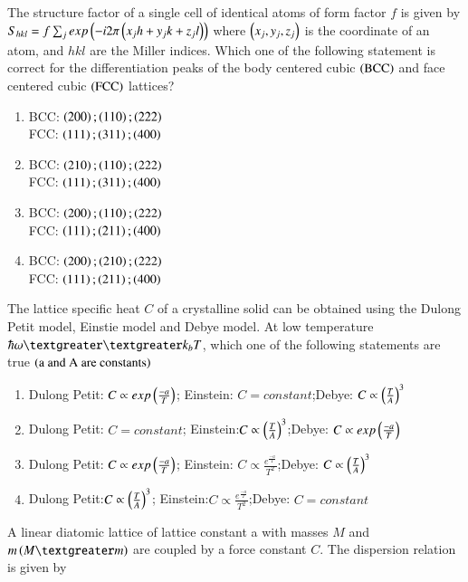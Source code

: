 \documentclass[journal]{IEEEtran}
\begin{document}
\begin{enumerate}
{\begin{enumerate}
\end{enumerate}
\item{
The structure factor of a single cell of identical atoms of form factor $f$ is given by $S_{hkl}=f\sum_jexp\left(-i2\pi\left(x_jh+y_jk+z_jl\right)\right)$ where $\left(x_j,y_j,z_j\right)$ is the coordinate of an atom, and $hkl$ are the Miller indices. Which one of the following statement is correct for the differentiation peaks of the body centered cubic $\left(\text{BCC}\right)$ and face centered cubic $\left(\text{FCC}\right)$ lattices?
\begin{multicols}{2}
\begin{enumerate}
\item BCC: $\left(200\right);\left(110\right);\left(222\right)$\\FCC: $\left(111\right);\left(311\right);\left(400\right)$
\item BCC: $\left(210\right);\left(110\right);\left(222\right)$\\FCC: $\left(111\right);\left(311\right);\left(400\right)$
\item BCC: $\left(200\right);\left(110\right);\left(222\right)$\\FCC: $\left(111\right);\left(211\right);\left(400\right)$
\item BCC: $\left(200\right);\left(210\right);\left(222\right)$\\FCC: $\left(111\right);\left(211\right);\left(400\right)$
\end{enumerate}
\end{multicols}
}
\item{
The lattice specific heat $C$ of a crystalline solid can be obtained using the Dulong Petit model, Einstie model and Debye model. At low temperature $\hbar\omega\textgreater\textgreater k_bT$, which one of the following statements are true $\left(\text{a and A are constants}\right)$
\begin{enumerate}
\item Dulong Petit: $C\propto exp\left(\frac{-a}{T}\right)$; Einstein: $C=constant$;Debye: $C\propto\left(\frac{T}{A}\right)^3$
\item Dulong Petit: $C=constant$; Einstein:$C\propto\left(\frac{T}{A}\right)^3$;Debye:  $C\propto exp\left(\frac{-a}{T}\right)$
\item Dulong Petit: $C\propto exp\left(\frac{-a}{T}\right)$; Einstein:  $C\propto\frac{e^{\frac{-a}{T}}}{T^2}$;Debye: $C\propto\left(\frac{T}{A}\right)^3$
\item Dulong Petit:$C\propto\left(\frac{T}{A}\right)^3$; Einstein:$C\propto\frac{e^{\frac{-a}{T}}}{T^2}$;Debye: $C=constant$ 
\end{enumerate}
}
\item{
A linear diatomic lattice of lattice constant a with masses $M$ and $m\brak{M\textgreater m}$ are coupled by a force constant $C$. The dispersion relation is given by\\
}}
\end{enumerate}
\end{document}
